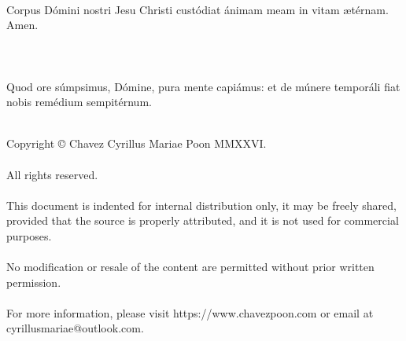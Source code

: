 \documentclass[12pt, a4paper]{article}
\begin{document}
	\\
	Corpus Dómini nostri Jesu Christi custódiat ánimam meam in vitam ætérnam. Amen.
	\\\\
	\\
	\\
	Quod ore súmpsimus, Dómine, pura mente capiámus: et de múnere temporáli fiat nobis remédium sempitérnum.
	\\\\
	
	\newpage 
	
	\mbox{}
	\vfill
	\noindent Copyright © Chavez Cyrillus Mariae Poon MMXXVI.
	\\\\
	All rights reserved.
	\\\\
	This document is indented for internal distribution only, it may be freely shared, provided that
	the source is properly attributed, and it is not used for commercial purposes.
	\\\\
	No modification or resale of the content are permitted without prior written permission.
	\\\\
	For more information, please visit https://www.chavezpoon.com or email at \\cyrillusmariae@outlook.com.
\end{document}
